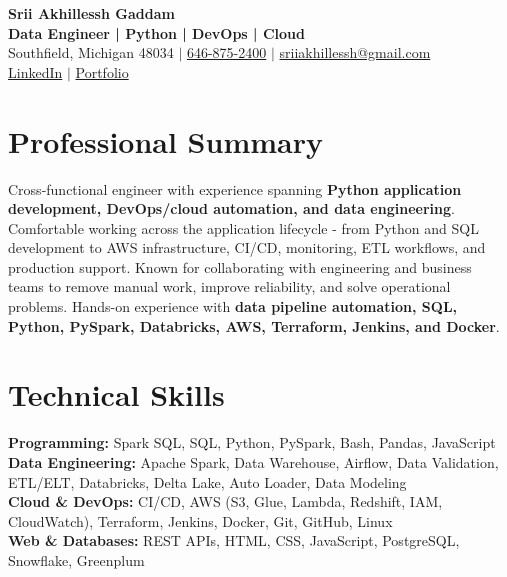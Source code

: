 \documentclass[letterpaper,10pt]{article}
\begin{document}
\fontsize{9.35pt}{10.45pt}\selectfont

\begin{center}
    {\LARGE \textbf{Srii Akhillessh Gaddam}} \\[-1pt]
    \textbf{Data Engineer | Python | DevOps | Cloud} \\[2pt]
    Southfield, Michigan 48034 $|$
    \href{tel:6468752400}{646-875-2400} $|$
    \href{mailto:sriiakhillessh@gmail.com}{sriiakhillessh@gmail.com} \\[1pt]
    \href{https://www.linkedin.com/in/srii-akhiilessh-gaddam-b48668191/}{LinkedIn} $|$
    \href{https://sriiakhillesshg.github.io/portfolio/}{Portfolio}
\end{center}
\vspace{-8pt}

\section{Professional Summary}
\small{Cross-functional engineer with experience spanning \textbf{Python application development, DevOps/cloud automation, and data engineering}. Comfortable working across the application lifecycle - from Python and SQL development to AWS infrastructure, CI/CD, monitoring, ETL workflows, and production support. Known for collaborating with engineering and business teams to remove manual work, improve reliability, and solve operational problems. Hands-on experience with \textbf{data pipeline automation, SQL, Python, PySpark, Databricks, AWS, Terraform, Jenkins, and Docker}.}

\section{Technical Skills}
\small{
\textbf{Programming:} Spark SQL, SQL, Python, PySpark, Bash, Pandas, JavaScript \\
\textbf{Data Engineering:} Apache Spark, Data Warehouse, Airflow, Data Validation, ETL/ELT, Databricks, Delta Lake, Auto Loader, Data Modeling \\
\textbf{Cloud \& DevOps:} CI/CD, AWS (S3, Glue, Lambda, Redshift, IAM, CloudWatch), Terraform, Jenkins, Docker, Git, GitHub, Linux \\
\textbf{Web \& Databases:} REST APIs, HTML, CSS, JavaScript, PostgreSQL, Snowflake, Greenplum
}
\end{document}

